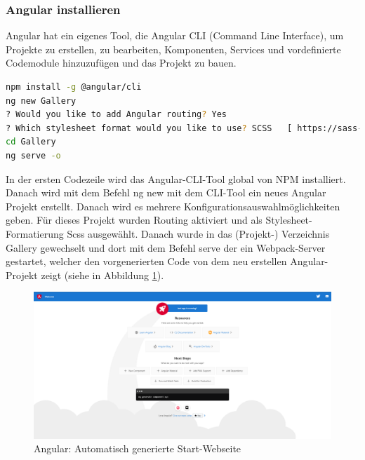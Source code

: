 \subsubsection{Angular installieren}\label{sec:AngularCLI}
Angular hat ein eigenes Tool, die Angular CLI (Command Line Interface), um Projekte zu erstellen, zu bearbeiten, Komponenten, Services und vordefinierte Codemodule hinzuzufügen und das Projekt zu bauen.

\begin{lstlisting}[caption={{Terminalm - Angular aufsetzen, Installation der CLI, Configuration eines neuen Projektes, Starten des Projektes}},language=bash]
npm install -g @angular/cli 
ng new Gallery
? Would you like to add Angular routing? Yes
? Which stylesheet format would you like to use? SCSS   [ https://sass-lang.com/documentation/syntax#scss ]
cd Gallery
ng serve -o
\end{lstlisting}

In der ersten Codezeile wird das Angular-CLI-Tool global von NPM installiert.
Danach wird mit dem Befehl ng new mit dem CLI-Tool ein neues Angular Projekt erstellt. Danach wird es mehrere Konfigurationsauswahlmöglichkeiten geben. Für dieses Projekt wurden Routing aktiviert und  als Stylesheet-Formatierung Scss ausgewählt. Danach wurde in das (Projekt-) Verzeichnis Gallery gewechselt und dort mit dem Befehl serve der ein Webpack-Server gestartet, welcher den vorgenerierten Code von dem neu erstellen Angular-Projekt zeigt (siehe in Abbildung \ref{fig:impl:angular-starting-page}). 

\begin{figure}[h t]
    \centering
    \includegraphics[scale=0.25]{pics/AngularStartingPage.png}
    \caption{Angular: Automatisch generierte Start-Webseite}
    \label{fig:impl:angular-starting-page}
\end{figure}

